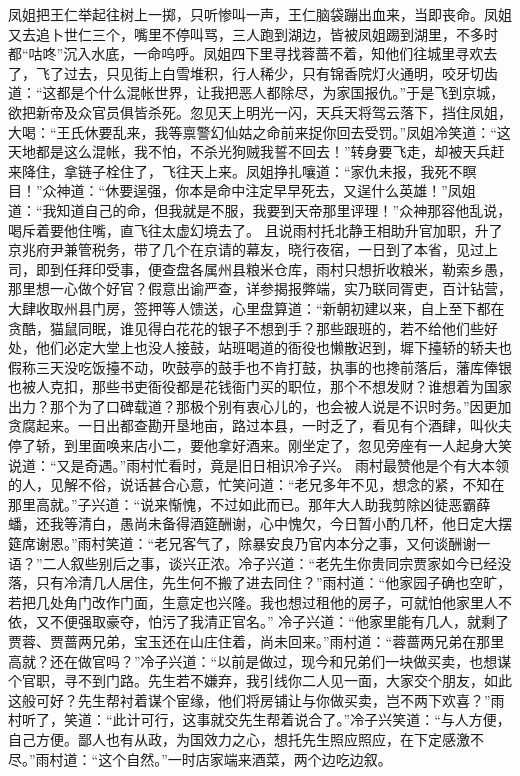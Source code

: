 \documentclass[12pt,oneside]{book}
\begin{document}
凤姐把王仁举起往树上一掷，只听惨叫一声，王仁脑袋蹦出血来，当即丧命。凤姐又去追卜世仁三个，嘴里不停叫骂，三人跑到湖边，皆被凤姐踢到湖里，不多时都“咕咚”沉入水底，一命呜呼。凤姐四下里寻找蓉蔷不着，知他们往城里寻欢去了，飞了过去，只见街上白雪堆积，行人稀少，只有锦香院灯火通明，咬牙切齿道：“这都是个什么混帐世界，让我把恶人都除尽，为家国报仇。”于是飞到京城，欲把新帝及众官员俱皆杀死。忽见天上明光一闪，天兵天将驾云落下，挡住凤姐，大喝：“王氏休要乱来，我等禀警幻仙姑之命前来捉你回去受罚。”凤姐冷笑道：“这天地都是这么混帐，我不怕，不杀光狗贼我誓不回去！”转身要飞走，却被天兵赶来降住，拿链子栓住了，飞往天上来。凤姐挣扎嚷道：“家仇未报，我死不瞑目！”众神道：“休要逞强，你本是命中注定早早死去，又逞什么英雄！”凤姐道：“我知道自己的命，但我就是不服，我要到天帝那里评理！”众神那容他乱说，喝斥着要他住嘴，直飞往太虚幻境去了。
且说雨村托北静王相助升官加职，升了京兆府尹兼管税务，带了几个在京请的幕友，晓行夜宿，一日到了本省，见过上司，即到任拜印受事，便查盘各属州县粮米仓库，雨村只想折收粮米，勒索乡愚，那里想一心做个好官？假意出谕严查，详参揭报弊端，实乃联同胥吏，百计钻营，大肆收取州县门房，签押等人馈送，心里盘算道：“新朝初建以来，自上至下都在贪酷，猫鼠同眠，谁见得白花花的银子不想到手？那些跟班的，若不给他们些好处，他们必定大堂上也没人接鼓，站班喝道的衙役也懒散迟到，墀下擡轿的轿夫也假称三天没吃饭擡不动，吹鼓亭的鼓手也不肯打鼓，执事的也搀前落后，藩库俸银也被人克扣，那些书吏衙役都是花钱衙门买的职位，那个不想发财？谁想着为国家出力？那个为了口碑载道？那极个别有衷心儿的，也会被人说是不识时务。”因更加贪腐起来。一日出都查勘开垦地亩，路过本县，一时乏了，看见有个酒肆，叫伙夫停了轿，到里面唤来店小二，要他拿好酒来。刚坐定了，忽见旁座有一人起身大笑说道：“又是奇遇。”雨村忙看时，竟是旧日相识冷子兴。
雨村最赞他是个有大本领的人，见解不俗，说话甚合心意，忙笑问道：“老兄多年不见，想念的紧，不知在那里高就。”子兴道：“说来惭愧，不过如此而已。那年大人助我剪除凶徒恶霸薛蟠，还我等清白，愚尚未备得酒筵酬谢，心中愧欠，今日暂小酌几杯，他日定大摆筵席谢恩。”雨村笑道：“老兄客气了，除暴安良乃官内本分之事，又何谈酬谢一语？”二人叙些别后之事，谈兴正浓。冷子兴道：“老先生你贵同宗贾家如今已经没落，只有冷清几人居住，先生何不搬了进去同住？”雨村道：“他家园子确也空旷，若把几处角门改作门面，生意定也兴隆。我也想过租他的房子，可就怕他家里人不依，又不便强取豪夺，怕污了我清正官名。”
冷子兴道：“他家里能有几人，就剩了贾蓉、贾蔷两兄弟，宝玉还在山庄住着，尚未回来。”雨村道：“蓉蔷两兄弟在那里高就？还在做官吗？”冷子兴道：“以前是做过，现今和兄弟们一块做买卖，也想谋个官职，寻不到门路。先生若不嫌弃，我引线你二人见一面，大家交个朋友，如此这般可好？先生帮衬着谋个宦缘，他们将房铺让与你做买卖，岂不两下欢喜？”雨村听了，笑道：“此计可行，这事就交先生帮着说合了。”冷子兴笑道：“与人方便，自己方便。鄙人也有从政，为国效力之心，想托先生照应照应，在下定感激不尽。”雨村道：“这个自然。”一时店家端来酒菜，两个边吃边叙。
\end{document}
